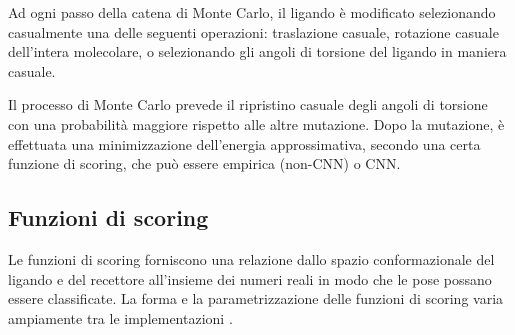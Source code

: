 Ad ogni passo della catena di Monte Carlo, il ligando è modificato selezionando casualmente una delle seguenti operazioni: traslazione casuale, rotazione casuale dell'intera molecolare, o selezionando gli angoli di torsione del ligando in maniera casuale. 

Il processo di Monte Carlo prevede il ripristino casuale degli angoli di torsione con una probabilità maggiore rispetto alle altre mutazione. Dopo la mutazione, è effettuata una minimizzazione dell'energia approssimativa,  secondo una certa funzione di scoring, che può essere empirica (non-CNN) o CNN. 

\subsection{Funzioni di scoring}
Le funzioni di scoring forniscono una relazione dallo spazio conformazionale del ligando e del recettore all'insieme dei numeri reali in modo che le pose possano essere classificate. 
La forma e la parametrizzazione delle funzioni di scoring varia ampiamente tra le implementazioni \cite{mcnutt_gnina_2021}.

